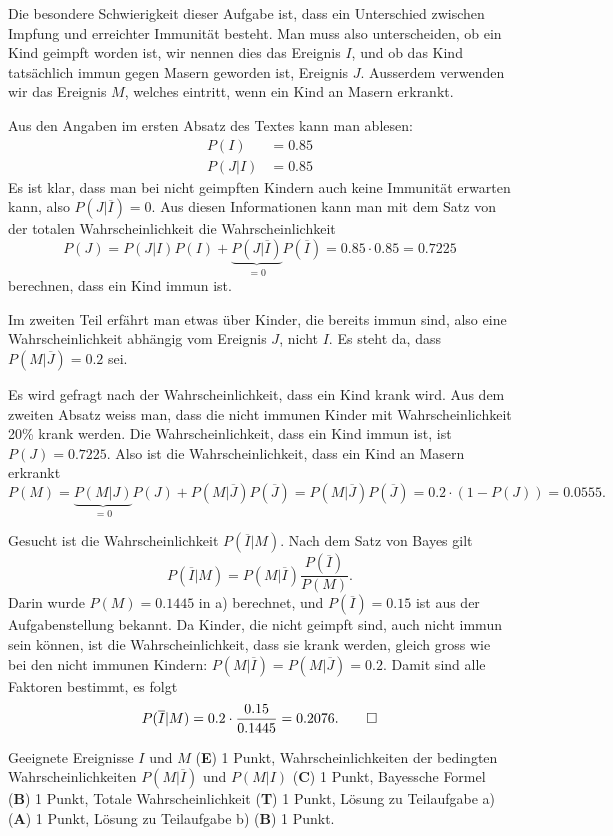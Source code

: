 \begin{loesung}
Die besondere Schwierigkeit dieser Aufgabe ist, dass ein Unterschied
zwischen Impfung und erreichter Immunität besteht.
Man muss also unterscheiden, ob ein Kind geimpft worden ist, wir nennen
dies das Ereignis $I$, und ob das Kind tatsächlich immun gegen Masern
geworden ist, Ereignis $J$. 
Ausserdem verwenden wir das Ereignis $M$, welches eintritt, wenn ein
Kind an Masern erkrankt.

Aus den Angaben im ersten Absatz des Textes kann man ablesen:
\begin{align*}
P(I)&=0.85
\\
P(J|I)&=0.85
\end{align*}
Es ist klar, dass man bei nicht geimpften Kindern auch keine Immunität
erwarten kann, also $P(J|\overline{I})=0$.
Aus diesen Informationen kann man mit dem Satz von der totalen
Wahrscheinlichkeit
die Wahrscheinlichkeit
\[
P(J)
=
P(J|I)P(I) + \underbrace{P(J|\overline{I})}_{\displaystyle=0}P(\overline{I})
= 
0.85 \cdot 0.85=0.7225
\]
berechnen, dass ein Kind immun ist.

Im zweiten Teil erfährt man etwas über Kinder, die bereits immun sind,
also eine Wahrscheinlichkeit abhängig vom Ereignis $J$, nicht $I$.
Es steht da, dass $P(M|\overline{J})=0.2$ sei.

\begin{teilaufgaben}
\item
Es wird gefragt nach der Wahrscheinlichkeit, dass ein Kind krank wird.
Aus dem zweiten Absatz weiss man, dass die nicht immunen Kinder mit
Wahrscheinlichkeit 20\% krank werden.
Die Wahrscheinlichkeit, dass ein Kind immun ist, ist $P(J)=0.7225$.
Also ist die Wahrscheinlichkeit, dass ein Kind an Masern erkrankt
\[
P(M)
=
\underbrace{P(M|J)}_{\displaystyle=0}P(J)
+
P(M|\overline{J})P(\overline{J})
=
P(M|\overline{J})P(\overline{J})
=
0.2\cdot (1-P(J))=0.0555.
\]
\item
Gesucht ist die Wahrscheinlichkeit $P(\overline{I}|M)$.
Nach dem Satz von Bayes gilt
\[
P(\overline{I}|M)
=
P(M|\overline{I})\frac{P(\overline{I})}{P(M)}.
\]
Darin wurde $P(M)=0.1445$ in a) berechnet, und $P(\overline{I})=0.15$
ist aus der Aufgabenstellung bekannt.
Da Kinder, die nicht geimpft sind, auch nicht immun sein können,
ist die Wahrscheinlichkeit, dass sie krank werden, gleich gross wie
bei den nicht immunen Kindern: $P(M|\overline{I})=P(M|\overline{J})=0.2$.
Damit sind alle Faktoren bestimmt, es folgt
\[
P(\overline{I}|M)
=
0.2\cdot\frac{0.15}{0.1445}
=
0.2076.
\qedhere
\]
\end{teilaufgaben}
\end{loesung}

\begin{bewertung}
Geeignete Ereignisse $I$ und $M$ ({\bf E}) 1 Punkt,
Wahrscheinlichkeiten der bedingten Wahrscheinlichkeiten $P(M|\overline{I})$
und $P(M|I)$ ({\bf C}) 1 Punkt,
Bayessche Formel ({\bf B}) 1 Punkt,
Totale Wahrscheinlichkeit ({\bf T}) 1 Punkt,
Lösung zu Teilaufgabe a) ({\bf A}) 1 Punkt,
Lösung zu Teilaufgabe b) ({\bf B}) 1 Punkt.
\end{bewertung}

